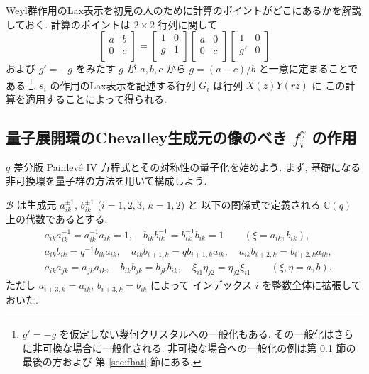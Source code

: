 \documentclass[12pt,twoside,dvipdfm]{msjproc}
\newcommand\C{{\mathbb C}} %
\theoremstyle{definition} %
\theoremstyle{definition} %
\theoremstyle{definition} %
\numberwithin{theorem}{section}
\numberwithin{equation}{section}
\numberwithin{figure}{section}
\numberwithin{table}{section}
\newcommand\secref[1]{第 \ref{#1} 節}
\newcommand\B{\mathcal{B}}
\begin{document}
Weyl群作用のLax表示を初見の人のために計算のポイントがどこにあるかを解説しておく.
計算のポイントは $2\times 2$ 行列に関して
\begin{equation*}
 \begin{bmatrix}
   a & b \\
   0 & c \\
 \end{bmatrix}
 =
 \begin{bmatrix}
   1 & 0 \\
   g & 1 \\
 \end{bmatrix}
 \begin{bmatrix}
   a & 0 \\
   0 & c \\
 \end{bmatrix}
 \begin{bmatrix}
   1  & 0 \\
   g' & 0 \\
 \end{bmatrix}
\end{equation*}
および $g'=-g$ をみたす $g$ が $a,b,c$ から $g=(a-c)/b$ と一意に定まることである%
\footnote{$g'=-g$ を仮定しない幾何クリスタルへの一般化もある. 
その一般化はさらに非可換な場合に一般化される.
非可換な場合への一般化の例は\secref{sec:f^gamma}の最後の方および
\secref{sec:fhat}にある.}.
$s_i$ の作用のLax表示を記述する行列 $G_i$ は行列 $X(z)Y(rz)$ に
この計算を適用することによって得られる.



\subsection{量子展開環のChevalley生成元の像のべき $f_i^\gamma$ の作用}
\label{sec:f^gamma}

$q$ 差分版 Painlev\'e IV 方程式とその対称性の量子化を始めよう.
まず, 基礎になる非可換環を量子群の方法を用いて構成しよう.

$\B$ は生成元 $a_{ik}^{\pm1}$, $b_{ik}^{\pm1}$ ($i=1,2,3$, $k=1,2$) と
以下の関係式で定義される $\C(q)$ 上の代数であるとする:
\begin{align*}
 &
 a_{ik}a_{ik}^{-1} = a_{ik}^{-1}a_{ik} = 1, \quad
 b_{ik}b_{ik}^{-1} = b_{ik}^{-1}b_{ik} = 1
 \qquad (\xi=a_{ik},b_{ik}),
 \\ &
 a_{ik} b_{ik} = q^{-1} b_{ik} a_{ik}, \quad
 a_{ik} b_{i+1,k} = q b_{i+1,k} a_{ik}, \quad
 a_{ik} b_{i+2,k} = b_{i+2,k} a_{ik}, 
 \\ &
 a_{ik} a_{jk} = a_{jk} a_{ik}, \quad
 b_{ik} b_{jk} = b_{jk} b_{ik}, \quad
 \xi_{i1} \eta_{j2} = \eta_{j2} \xi_{i1} \qquad (\xi,\eta=a,b).
\end{align*}
ただし $a_{i+3,k}=a_{ik}$, $b_{i+3,k}=b_{ik}$ によって
インデックス $i$ を整数全体に拡張しておいた.
\end{document}
